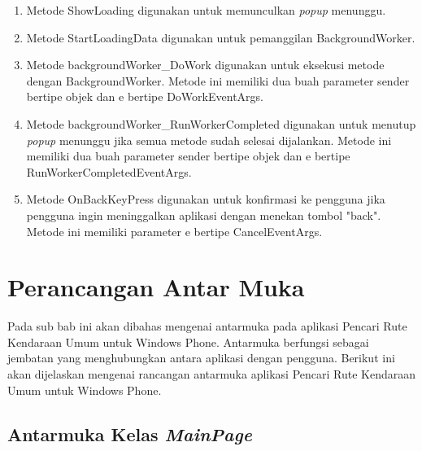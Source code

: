 \begin{enumerate}
	\item Metode ShowLoading digunakan untuk memunculkan \textit{popup} menunggu.
	\item Metode StartLoadingData digunakan untuk pemanggilan BackgroundWorker.
	\item Metode backgroundWorker\_DoWork digunakan untuk eksekusi metode dengan BackgroundWorker. Metode ini memiliki dua buah parameter sender bertipe objek dan e bertipe DoWorkEventArgs.
	\item Metode backgroundWorker\_RunWorkerCompleted digunakan untuk menutup \textit{popup} menunggu jika semua metode sudah selesai dijalankan. Metode ini memiliki dua buah parameter sender bertipe objek dan e bertipe RunWorkerCompletedEventArgs.
	\item Metode OnBackKeyPress digunakan untuk konfirmasi ke pengguna jika pengguna ingin meninggalkan aplikasi dengan menekan tombol "back". Metode ini memiliki parameter e bertipe CancelEventArgs.
\end{enumerate}

\section{Perancangan Antar Muka}
\label{lab:Perancangan Kelas}
\hspace{0.5cm} Pada sub bab ini akan dibahas mengenai antarmuka pada aplikasi Pencari Rute Kendaraan Umum untuk Windows Phone. Antarmuka berfungsi sebagai jembatan yang menghubungkan antara aplikasi dengan pengguna. Berikut ini akan dijelaskan mengenai rancangan antarmuka aplikasi Pencari Rute Kendaraan Umum untuk Windows Phone. 

\subsection{Antarmuka Kelas \textit{MainPage}}
\label{lab:Antarmuka Kelas MainPage}

